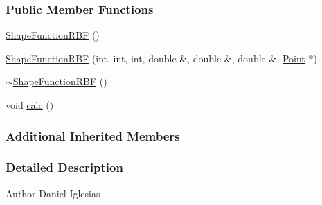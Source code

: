 \subsubsection*{Public Member Functions}
\begin{DoxyCompactItemize}
\item 
\hyperlink{classmknix_1_1_shape_function_r_b_f_a9ef5a4d07fa2a1d2203135c53db614e8}{Shape\-Function\-R\-B\-F} ()
\item 
\hyperlink{classmknix_1_1_shape_function_r_b_f_ac4cf69a304fa69e9cb62d94d11d2a780}{Shape\-Function\-R\-B\-F} (int, int, int, double \&, double \&, double \&, \hyperlink{classmknix_1_1_point}{Point} $\ast$)
\item 
\hyperlink{classmknix_1_1_shape_function_r_b_f_a7a46908b3fbbbd7ffc312698e15b3d8f}{$\sim$\-Shape\-Function\-R\-B\-F} ()
\item 
void \hyperlink{classmknix_1_1_shape_function_r_b_f_a84441360824f4a8b754d0ae9f547c4ee}{calc} ()
\end{DoxyCompactItemize}
\subsubsection*{Additional Inherited Members}


\subsubsection{Detailed Description}
\begin{DoxyAuthor}{Author}
Daniel Iglesias 
\end{DoxyAuthor}


